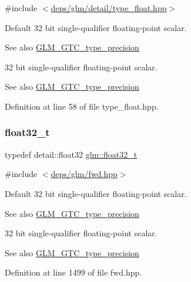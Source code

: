 {\ttfamily \#include $<$\hyperlink{type__float_8hpp}{deps/glm/detail/type\+\_\+float.\+hpp}$>$}

Default 32 bit single-\/qualifier floating-\/point scalar. \begin{DoxySeeAlso}{See also}
\hyperlink{group__gtc__type__precision}{G\+L\+M\+\_\+\+G\+T\+C\+\_\+type\+\_\+precision}
\end{DoxySeeAlso}
32 bit single-\/qualifier floating-\/point scalar. \begin{DoxySeeAlso}{See also}
\hyperlink{group__gtc__type__precision}{G\+L\+M\+\_\+\+G\+T\+C\+\_\+type\+\_\+precision} 
\end{DoxySeeAlso}


Definition at line 58 of file type\+\_\+float.\+hpp.

\mbox{\label{group__gtc__type__precision_ga642737ae3e7c434b366f2191e6944bf2}} 
\subsubsection{\texorpdfstring{float32\+\_\+t}{float32\_t}}
{\footnotesize\ttfamily typedef detail\+::float32 \hyperlink{group__gtc__type__precision_ga642737ae3e7c434b366f2191e6944bf2}{glm\+::float32\+\_\+t}}



{\ttfamily \#include $<$\hyperlink{fwd_8hpp}{deps/glm/fwd.\+hpp}$>$}

Default 32 bit single-\/qualifier floating-\/point scalar. \begin{DoxySeeAlso}{See also}
\hyperlink{group__gtc__type__precision}{G\+L\+M\+\_\+\+G\+T\+C\+\_\+type\+\_\+precision}
\end{DoxySeeAlso}
32 bit single-\/qualifier floating-\/point scalar. \begin{DoxySeeAlso}{See also}
\hyperlink{group__gtc__type__precision}{G\+L\+M\+\_\+\+G\+T\+C\+\_\+type\+\_\+precision} 
\end{DoxySeeAlso}


Definition at line 1499 of file fwd.\+hpp.

\mbox{\label{group__gtc__type__precision_gab721f828b41f46b20cf4883b50733d3b}} 
